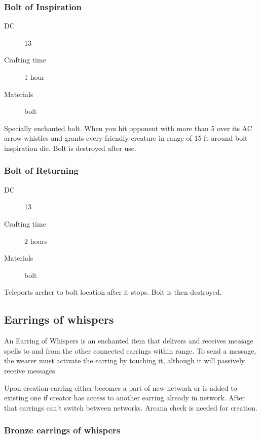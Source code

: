 \subsubsection{Bolt of Inspiration}

\begin{description}
\item [DC] 13 \arcana
\item [Crafting time] 1 hour
\item [Materials] bolt
\end{description}

Specially enchanted bolt. When you hit opponent with more than 5 over its AC arrow whistles and grants every friendly creature in range of 15 ft around bolt  inspiration die. Bolt is destroyed after use.

\subsubsection{Bolt of Returning}

\begin{description}
\item [DC] 13 \arcana
\item [Crafting time] 2 hours
\item [Materials] bolt
\end{description}

Teleports archer to bolt location after it stops. Bolt is then destroyed.

\subsection{Earrings of whispers}

An Earring of Whispers is an enchanted item that delivers and receives message spells to and from the other connected earrings within range. To send a message, the wearer must activate the earring by touching it, although it will passively receive messages.

Upon creation earring either becomes a part of new network or is added to existing one if creator has access to another earring already in network. After that earrings can't switch between networks. Arcana check is needed for creation.

\subsubsection{Bronze earrings of whispers}

